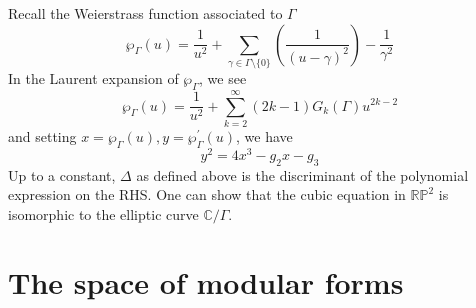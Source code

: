 \documentclass[12pt]{article}
\theoremstyle{definition}
\begin{document}
Recall the Weierstrass function associated to \(\Gamma \)
\[
    \wp_\Gamma (u) = \frac{1}{u^{2} }+\sum_{\gamma \in \Gamma \setminus \{ 0 \} }\left(\frac{1}{(u-\gamma )^2} \right) - \frac{1}{\gamma ^2}
\] 
In the Laurent expansion of \(\wp_\Gamma\), we see
\[
    \wp_\Gamma (u) = \frac{1}{u^{2} } + \sum_{k=2}^{\infty} (2k-1)G_k(\Gamma )u^{2k-2} 
\] 
and setting \(x = \wp_\Gamma (u), y = \wp_\Gamma ^{\prime} (u)\), we have
\[
    y^2=4x^3- g_{2} x -g_3 
\] 
Up to a constant, \(\Delta \) as defined above is the discriminant of the polynomial expression on the RHS. One can show that the cubic equation in \(\mathbb{R} \mathbb{P} ^2\) is isomorphic to the elliptic curve \(\mathbb{C} /\Gamma \).
\newpage
\section{The space of modular forms}
\end{document}
